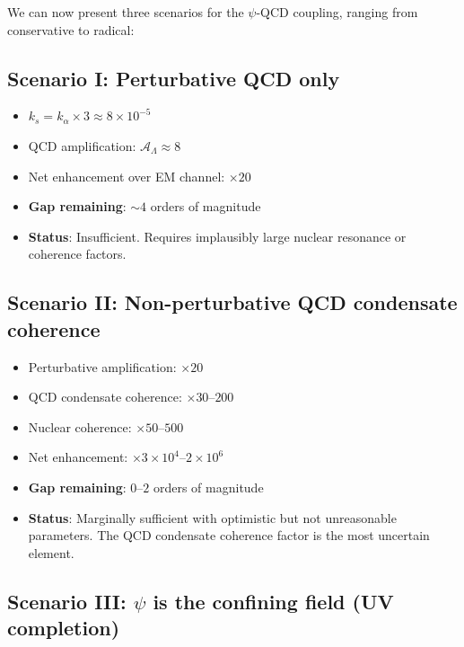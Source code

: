 \documentclass[aps,prd,twocolumn,superscriptaddress,floatfix,nofootinbib]{revtex4-2}
\begin{document}
We can now present three scenarios for the $\psi$-QCD coupling, ranging from
conservative to radical:

\subsection{Scenario I: Perturbative QCD only}

\begin{itemize}
\item $k_s = k_\alpha \times 3 \approx 8 \times 10^{-5}$
\item QCD amplification: $\mathcal{A}_\Lambda \approx 8$
\item Net enhancement over EM channel: $\times 20$
\item \textbf{Gap remaining}: $\sim 4$ orders of magnitude
\item \textbf{Status}: Insufficient. Requires implausibly large nuclear resonance
or coherence factors.
\end{itemize}

\subsection{Scenario II: Non-perturbative QCD condensate coherence}

\begin{itemize}
\item Perturbative amplification: $\times 20$
\item QCD condensate coherence: $\times 30$--$200$
\item Nuclear coherence: $\times 50$--$500$
\item Net enhancement: $\times 3 \times 10^4$--$2 \times 10^6$
\item \textbf{Gap remaining}: $0$--$2$ orders of magnitude
\item \textbf{Status}: Marginally sufficient with optimistic but not unreasonable
parameters. The QCD condensate coherence factor is the most uncertain element.
\end{itemize}

\subsection{Scenario III: $\psi$ is the confining field (UV completion)}
\end{document}

